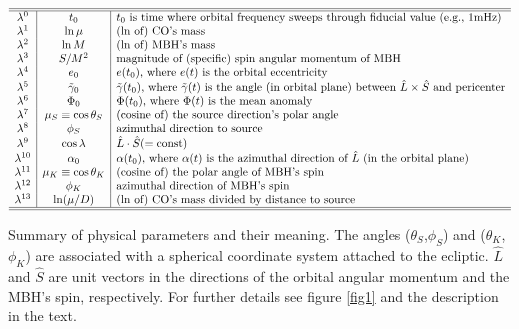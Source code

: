 \documentclass[11pt]{report}
\begin{document}
\begin{table}[thb]
\centerline{$\begin{array}{c|c|l}\hline\hline
\lambda^0 & t_0      & \text{$t_0$ is time where orbital frequency
    sweeps through fiducial value (e.g., 1mHz)}   \\
\lambda^1 & \ln\mu        & \text {($\ln$ of) CO's mass}\\
\lambda^2 & \ln M         & \text {($\ln$ of) MBH's mass}\\
\lambda^3 & S/M^2         & \text{magnitude of (specific) spin
    angular momentum of MBH} \\
\lambda^4 & e_0           & \text{$e(t_0)$, where $e(t)$ is the
    orbital eccentricity} \\
\lambda^5 & \tilde\gamma_0 &  \text{$\tilde\gamma(t_0)$,
    where $\tilde\gamma(t)$ is the angle (in orbital plane)
    between $\hat L\times\hat S$ and pericenter}      \\
\lambda^6 & \Phi_0        & \text{$\Phi(t_0)$, where $\Phi(t)$ is
    the mean anomaly}\\
\lambda^7 & \mu_S\equiv\cos\theta_S  & \text{(cosine of) the source direction's
    polar angle }  \\
\lambda^8 & \phi_S        & \text{azimuthal direction to source}  \\
\lambda^9 & \cos\lambda   & \hat L\cdot\hat S(={\rm const}) \\
\lambda^{10} & \alpha_0     & \text{$\alpha(t_0)$, where $\alpha(t)$
    is the azimuthal direction of $\hat L$ (in the orbital plane)}   \\
\lambda^{11} & \mu_K\equiv\cos\theta_K & \text{(cosine of) the polar angle
   of MBH's spin}  \\
\lambda^{12} & \phi_K       &  \text{azimuthal direction of MBH's
    spin}  \\
\lambda^{13} & \ln(\mu/D)          & \text{($\ln$ of) CO's mass divided by distance to source}\\
\hline\hline
\end{array}$}
\caption{\protect\footnotesize
Summary of physical parameters and their meaning.
The angles ($\theta_S$,$\phi_S$) and ($\theta_K$,$\phi_K$)
are associated with a spherical coordinate system attached to the ecliptic.
$\hat L$ and $\hat S$ are unit vectors in the directions
of the orbital angular momentum and the MBH's spin, respectively.
For further details see figure \ref{fig1} and the description
in the text.}\label{tableI}
\end{table}
\end{document}
